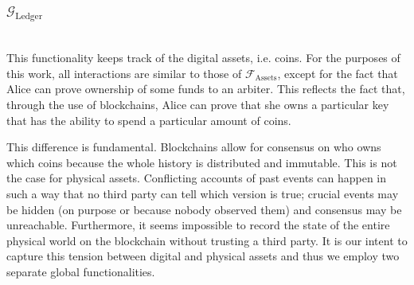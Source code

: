 \subsubsection{$\mathcal{G}_{\mathrm{Ledger}}$} \ \\[0.5\baselineskip]
  This functionality keeps track of the digital assets, i.e. coins. For the purposes of
  this work, all interactions are similar to those of $\mathcal{F}_{\mathrm{Assets}}$,
  except for the fact that Alice can prove ownership of some funds to an arbiter. This
  reflects the fact that, through the use of blockchains, Alice can prove that she owns a
  particular key that has the ability to spend a particular amount of coins.

  This difference is fundamental. Blockchains allow for consensus on who owns which coins
  because the whole history is distributed and immutable. This is not the case for
  physical assets. Conflicting accounts of past events can happen in such a way that no
  third party can tell which version is true; crucial events may be hidden (on purpose or
  because nobody observed them) and consensus may be unreachable. Furthermore, it seems
  impossible to record the state of the entire physical world on the blockchain without
  trusting a third party. It is our intent to capture this tension between digital and
  physical assets and thus we employ two separate global functionalities.
